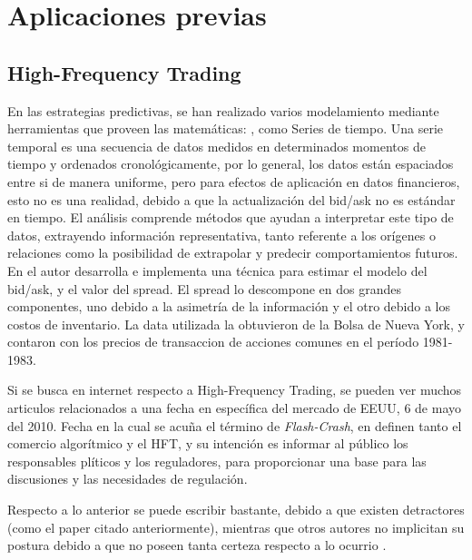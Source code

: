\section{Aplicaciones previas}
\subsection{High-Frequency Trading}
En las estrategias predictivas, se han realizado varios modelamiento mediante herramientas que proveen las matemáticas: \cite{azoff1994neural}, como Series de tiempo.
Una serie temporal es una secuencia de datos medidos en determinados momentos de tiempo y ordenados cronológicamente, por lo general, los datos están espaciados
entre si de manera uniforme, pero para efectos de aplicación en datos financieros, esto no es una realidad, debido a que la actualización del bid/ask no es estándar
en tiempo. El análisis comprende métodos que ayudan a interpretar este tipo de datos, extrayendo información representativa, tanto referente a los orígenes o relaciones
como la posibilidad de extrapolar y predecir comportamientos futuros. En \cite{glosten1988estimating} el autor desarrolla e implementa una técnica para estimar
el modelo del bid/ask, y el valor del spread. El spread lo descompone en dos grandes componentes,  uno debido a la asimetría de la información y el otro debido a
los costos de inventario. La data utilizada la obtuvieron de la Bolsa de Nueva York, y contaron con los precios de transaccion de acciones comunes en el período
1981-1983.

Si se busca en internet respecto a High-Frequency Trading, se pueden ver muchos articulos relacionados a una fecha en específica del mercado de EEUU, 6 de mayo del
2010. Fecha en la cual se acuña el término de  \emph{Flash-Crash}, en \cite{arndt2011high} definen tanto el comercio algorítmico y el HFT, y su intención es informar
al público los responsables plíticos y los reguladores, para proporcionar una base para las discusiones y las necesidades de regulación.

Respecto a lo anterior se puede escribir bastante, debido a que existen detractores (como el paper citado anteriormente), mientras que otros autores no implicitan su
postura debido a que no poseen tanta certeza respecto a lo ocurrio \cite{guo2012high}.

